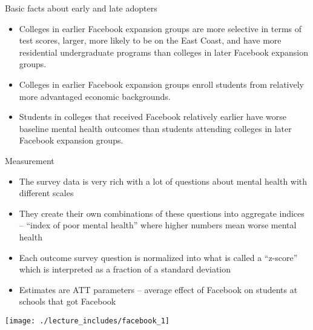 \documentclass{beamer}
\begin{document}
\begin{frame}{Basic facts about early and late adopters}

\begin{itemize}
\item Colleges in earlier Facebook expansion groups are more selective in terms of test scores, larger, more likely to be on the East Coast, and have more residential undergraduate programs than colleges in later Facebook expansion groups. 

\item Colleges in earlier Facebook expansion groups enroll students from relatively more advantaged economic backgrounds. 

\item Students in colleges that received Facebook relatively earlier have worse baseline mental health outcomes than students attending colleges in later Facebook expansion groups. 


\end{itemize}

\end{frame}

\begin{frame}{Measurement}

\begin{itemize}
\item The survey data is very rich with a lot of questions about mental health with different scales
\item They create their own combinations of these questions into aggregate indices -- ``index of poor mental health'' where higher numbers mean worse mental health
\item Each outcome survey question is normalized into what is called a ``z-score'' which is interpreted as a fraction of a standard deviation
\item Estimates are ATT parameters -- average effect of Facebook on students at schools that got Facebook
\end{itemize}

\end{frame}


\begin{frame}
\begin{center}
\texttt{[image: ./lecture\_includes/facebook\_1]}
\end{center}
\end{frame}
\end{document}
